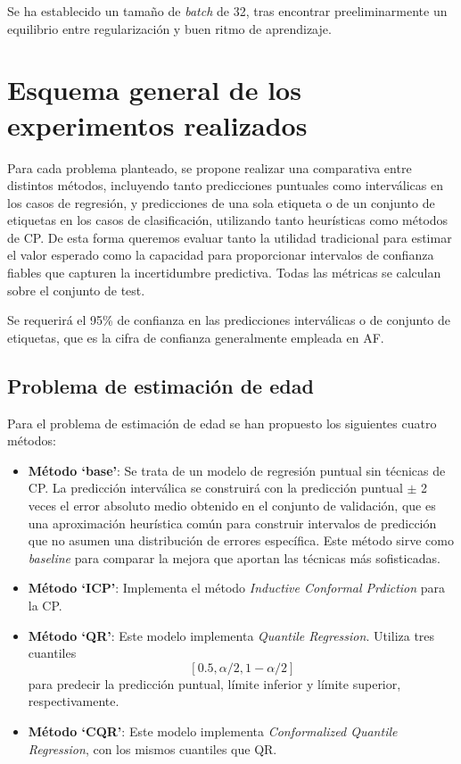 Se ha establecido un tamaño de \textit{batch} de 32, tras encontrar preeliminarmente un equilibrio entre 
regularización y buen ritmo de aprendizaje.


\section{Esquema general de los experimentos realizados}

Para cada problema planteado, se propone realizar una comparativa entre distintos métodos, incluyendo tanto predicciones puntuales como interválicas en los casos de regresión, y predicciones de una sola etiqueta o de un conjunto de etiquetas en los casos de clasificación, utilizando tanto heurísticas como métodos de CP.
De esta forma queremos evaluar tanto la utilidad tradicional para estimar el valor esperado como la capacidad para proporcionar intervalos de confianza fiables que capturen la incertidumbre predictiva. Todas las métricas se calculan sobre el conjunto de test. 

Se requerirá el 95\% de confianza en las predicciones interválicas o de conjunto de etiquetas, que es la cifra de confianza generalmente empleada en AF. 

\subsection{Problema de estimación de edad}

Para el problema de estimación de edad se han propuesto los siguientes cuatro métodos:

\begin{itemize}

    \item \textbf{Método `base'}: Se trata de un modelo de regresión puntual sin técnicas de CP. La predicción interválica se construirá con la predicción puntual $\pm$ 2 veces el error absoluto medio obtenido en el conjunto de validación, que es una aproximación heurística común para construir intervalos de predicción que no asumen una distribución de errores específica. Este método sirve como \textit{baseline} para comparar la mejora que aportan las técnicas más sofisticadas.

    \item \textbf{Método `ICP'}: Implementa el método \textit{Inductive Conformal Prdiction} para la CP. 
    
    \item \textbf{Método `QR'}: Este modelo implementa \textit{Quantile Regression}. Utiliza tres cuantiles 
    $$
    [0.5, \alpha/2, 1-\alpha/2]
    $$ 
    para predecir la predicción puntual, límite inferior y límite superior, respectivamente.

    \item \textbf{Método `CQR'}: Este modelo implementa \textit{Conformalized Quantile Regression}, con los mismos cuantiles que QR. 

\end{itemize} 

